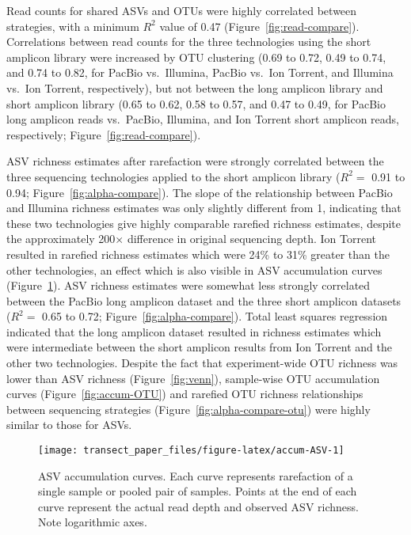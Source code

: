 \documentclass[
  12pt,
]{article}
\begin{document}
Read counts for shared ASVs and OTUs were highly correlated between strategies, with a minimum \(R^2\) value of 0.47 (Figure~\ref{fig:read-compare}).
Correlations between read counts for the three technologies using the short amplicon library were increased by OTU clustering
(0.69 to 0.72,
0.49 to 0.74, and
0.74 to 0.82,
for PacBio vs.~Illumina, PacBio vs.~Ion Torrent, and Illumina vs.~Ion Torrent, respectively), but not between the long amplicon library and short amplicon library
(0.65 to 0.62,
0.58 to 0.57, and
0.47 to 0.49, for PacBio long amplicon reads vs.~PacBio, Illumina, and Ion Torrent short amplicon reads, respectively; Figure~\ref{fig:read-compare}).

ASV richness estimates after rarefaction were strongly correlated between the three sequencing technologies applied to the short amplicon library (\(R^2 =\) 0.91 to 0.94; Figure~\ref{fig:alpha-compare}).
The slope of the relationship between PacBio and Illumina richness estimates was only slightly different from 1, indicating that these two technologies give highly comparable rarefied richness estimates, despite the approximately 200× difference in original sequencing depth.
Ion Torrent resulted in rarefied richness estimates which were 24\% to 31\% greater than the other technologies, an effect which is also visible in ASV accumulation curves (Figure~\ref{fig:accum-ASV}).
ASV richness estimates were somewhat less strongly correlated between the PacBio long amplicon dataset and the three short amplicon datasets (\(R^2 =\) 0.65 to 0.72; Figure~\ref{fig:alpha-compare}).
Total least squares regression indicated that the long amplicon dataset resulted in richness estimates which were intermediate between the short amplicon results from Ion Torrent and the other two technologies.
Despite the fact that experiment-wide OTU richness was lower than ASV richness (Figure~\ref{fig:venn}), sample-wise OTU accumulation curves (Figure~\ref{fig:accum-OTU}) and rarefied OTU richness relationships between sequencing strategies (Figure~\ref{fig:alpha-compare-otu}) were highly similar to those for ASVs.





\begin{figure}

{\centering \texttt{[image: transect\_paper\_files/figure-latex/accum-ASV-1]} 

}

\caption[ASV accumulation curves]{ASV accumulation curves. Each curve represents rarefaction of a single sample or pooled pair of samples. Points at the end of each curve represent the actual read depth and observed ASV richness. Note logarithmic axes.}\label{fig:accum-ASV}
\end{figure}
\end{document}
